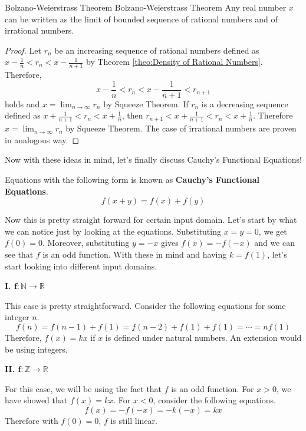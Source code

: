\documentclass[../../../main.tex]{subfiles}
\begin{document}
\begin{theorem}
{Bolzano-Weierstrass Theorem}
{Bolzano-Weierstrass Theorem}
Any real number $x$ can be written as the limit of bounded
sequence of rational numbers and of irrational numbers.
\end{theorem}
\begin{proof}
Let $r_n$ be an increasing sequence of rational numbers
defined as $x - \frac{1}{n} < r_n < x - \frac{1}{n+1}$ by
Theorem \ref{theo:Density of Rational Numbers}. Therefore,
\[
x - \frac{1}{n}
< r_n
< x - \frac{1}{n + 1}
< r_{n+1}
\]
holds and $x = \lim_{n \to \infty} r_n$ by Squeeze Theorem.
If $r_n$ is a decreasing sequence defined as
$x + \frac{1}{n+1} < r_n < x + \frac{1}{n}$, then
$r_{n+1} < x + \frac{1}{n+1} < r_n < x + \frac{1}{n}$.
Therefore $x = \lim_{n \to \infty} r_n$ by Squeeze Theorem.
The case of irrational numbers are proven in analogous way.
\end{proof}

Now with these ideas in mind, let's finally discuss
Cauchy's Functional Equations!

\begin{definition}{}{}
Equations with the following form is known as
\textbf{Cauchy's Functional Equations}.
\[
f(x + y) = f(x) + f(y)
\]
\end{definition}

Now this is pretty straight forward for certain input domain.
Let's start by what we can notice just by looking at the
equations. Substituting $x = y = 0$, we get $f(0) = 0$.
Moreover, substituting $y = -x$ gives $f(x) = -f(-x)$ and we
can see that $f$ is an odd function. With these in mind and having
$k = f(1)$, let's start looking into different input domains.

{\Large\textcolor{BrickRed}
{\textbf{I. $\mathbf{f: \mathbb{N} \to \mathbb{R}}$}}}

This case is pretty straightforward. Consider the following
equations for some integer $n$.
\[
f(n)
= f(n - 1) + f(1)
= f(n - 2) + f(1) + f(1)
= \cdots
= n f(1)
\]
Therefore, $f(x) = kx$ if $x$ is defined under natural numbers.
An extension would be using integers.

{\Large\textcolor{BrickRed}
{\textbf{II. $\mathbf{f: \mathbb{Z} \to \mathbb{R}}$}}}

For this case, we will be using the fact that $f$ is an odd function.
For $x > 0$, we have showed that $f(x) = kx$. For $x < 0$,
consider the following equations.
\[
f(x) = -f(-x) = -k(-x) = kx
\]
Therefore with $f(0) = 0$, $f$ is still linear.
\end{document}

